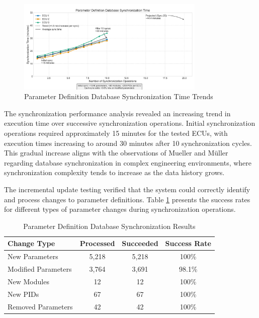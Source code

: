 \begin{figure}[h]
    \centering
    \includegraphics[width=0.8\textwidth]{figures/pdd_sync_time_graph.png}
    \caption{Parameter Definition Database Synchronization Time Trends}
    \label{fig:pdd-sync-time}
\end{figure}

The synchronization performance analysis revealed an increasing trend in execution time over successive synchronization operations. Initial synchronization operations required approximately 15 minutes for the tested ECUs, with execution times increasing to around 30 minutes after 10 synchronization cycles. This gradual increase aligns with the observations of Mueller and Müller \cite{mueller2018conception} regarding database synchronization in complex engineering environments, where synchronization complexity tends to increase as the data history grows.

The incremental update testing verified that the system could correctly identify and process changes to parameter definitions. Table \ref{tab:pdd-sync-results} presents the success rates for different types of parameter changes during synchronization operations.

\begin{table}[h]
\centering
\caption{Parameter Definition Database Synchronization Results}
\label{tab:pdd-sync-results}
\begin{tabular}{|l|c|c|c|}
\hline
\textbf{Change Type} & \textbf{Processed} & \textbf{Succeeded} & \textbf{Success Rate} \\
\hline
New Parameters & 5,218 & 5,218 & 100\% \\
\hline
Modified Parameters & 3,764 & 3,691 & 98.1\% \\
\hline
New Modules & 12 & 12 & 100\% \\
\hline
New PIDs & 67 & 67 & 100\% \\
\hline
Removed Parameters & 42 & 42 & 100\% \\
\hline
\end{tabular}
\end{table}

